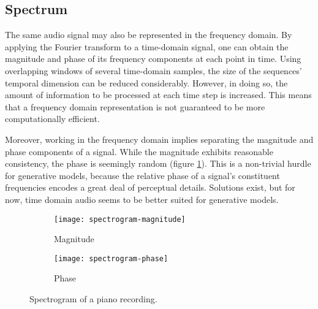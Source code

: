 \documentclass[../../report.tex]{subfiles}
\begin{document}
\subsection{Spectrum}

The same audio signal may also be represented in the frequency domain. By
applying the Fourier transform to a time-domain signal, one can obtain the
magnitude and phase of its frequency components at each point in time. Using
overlapping windows of several time-domain samples, the size of the sequences'
temporal dimension can be reduced considerably. However, in doing so, the amount
of information to be processed at each time step is increased. This means that a
frequency domain representation is not guaranteed to be more computationally
efficient. \cite{Dieleman2020}

Moreover, working in the frequency domain implies separating the magnitude and
phase components of a signal. While the magnitude exhibits reasonable
consistency, the phase is seemingly random (figure \ref{fig:spectrogram}). This
is a non-trivial hurdle for generative models, because the relative phase of a
signal's constituent frequencies encodes a great deal of perceptual details.
Solutions exist, but for now, time domain audio seems to be better suited for
generative models. \cite{Dieleman2020}

\begin{figure}
  \centering
  \begin{subfigure}[b]{0.49\textwidth}
    \texttt{[image: spectrogram-magnitude]}
    \caption{Magnitude}
  \end{subfigure}
  \hfill
  \begin{subfigure}[b]{0.49\textwidth}
    \texttt{[image: spectrogram-phase]}
    \caption{Phase}
  \end{subfigure}
  \caption{Spectrogram of a piano recording. \cite{Dieleman2020}}
  \label{fig:spectrogram}
\end{figure}
\end{document}
